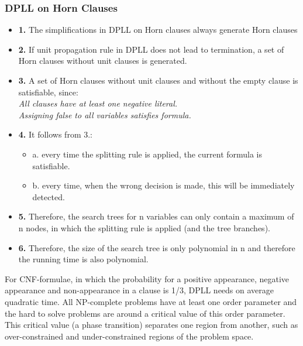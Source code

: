 \documentclass{article}
\begin{document}
\subsubsection{DPLL on Horn Clauses}
\begin{itemize}
\item \textbf{1.} The simplifications in DPLL on Horn clauses always generate Horn clauses
\item \textbf{2.} If unit propagation rule in DPLL does not lead to termination, a set of Horn clauses without unit clauses is generated.
\item \textbf{3.} A set of Horn clauses without unit clauses and without the empty clause is satisfiable, since: \\
\textit{All clauses have at least one negative literal.\\
Assigning false to all variables satisfies formula.}\\
\item \textbf{4.} It follows from 3.:
\begin{itemize}
\item a. every time the splitting rule is applied, the current formula is
satisfiable.\\
\item b. every time, when the wrong decision is made, this will be immediately detected.
\end{itemize}
\item \textbf{5.} Therefore, the search trees for n variables can only contain a maximum of n nodes, in which the splitting rule is applied (and the tree branches).
\item \textbf{6.} Therefore, the size of the search tree is only polynomial in n and therefore the running time is also polynomial.
\end{itemize}
For CNF-formulae, in which the probability for a positive appearance, negative appearance and non-appearance in a clause is 1/3, DPLL needs on average quadratic time. All NP-complete problems have at least one order parameter and the hard
to solve problems are around a critical value of this order parameter. This
critical value (a phase transition) separates one region from another, such as
over-constrained and under-constrained regions of the problem space.\\
\end{document}
